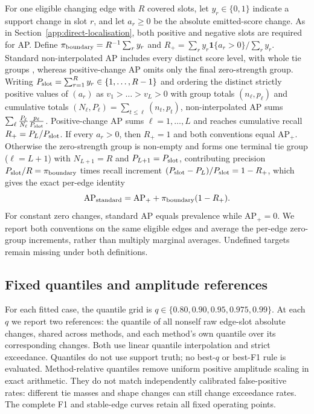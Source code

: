 \documentclass[11pt]{article}
\begin{document}
\label{app:standard-ap}
For one eligible changing edge with $R$ covered slots, let $y_r\in\{0,1\}$ indicate a support change
in slot $r$, and let $a_r\geq0$ be the absolute emitted-score change.
As in Section~\ref{app:direct-localisation}, both positive and negative slots
are required for AP. Define $\pi_{\rm boundary}=R^{-1}\sum_r y_r$ and
$R_+=\sum_r y_r\mathbf1\{a_r>0\}/\sum_r y_r$.
Standard non-interpolated AP includes every distinct score level, with whole
tie groups \citep{sklearn_average_precision_docs}, whereas positive-change AP
omits only the final zero-strength group. Writing $P_{\rm slot}=\sum_{r=1}^R y_r\in\{1,\dots,R-1\}$
and ordering the distinct strictly positive values of $(a_r)$ as
$v_1>\dots>v_L>0$ with group totals $(n_\ell,p_\ell)$ and cumulative totals
$(N_\ell,P_\ell)=\sum_{t\le\ell}(n_t,p_t)$, non-interpolated AP sums
$\sum_{\ell}\frac{P_\ell}{N_\ell}\frac{p_\ell}{P_{\rm slot}}$.
Positive-change AP sums $\ell=1,\dots,L$ and reaches cumulative recall
$R_+=P_L/P_{\rm slot}$. If every $a_r>0$, then $R_+=1$ and both conventions equal
$\mathrm{AP}_+$. Otherwise the zero-strength group is non-empty and forms one
terminal tie group ($\ell=L+1$) with $N_{L+1}=R$ and $P_{L+1}=P_{\rm slot}$,
contributing precision $P_{\rm slot}/R=\pi_{\rm boundary}$ times recall increment
$(P_{\rm slot}-P_L)/P_{\rm slot}=1-R_+$, which gives the exact per-edge identity
\begin{equation}
\mathrm{AP}_{\rm standard}
=\mathrm{AP}_+ + \pi_{\rm boundary}(1-R_+).
\label{eq:ap-zero-group}
\end{equation}
For constant zero changes, standard AP equals prevalence while $\mathrm{AP}_+=0$.
We report both conventions on the same eligible edges and average the
per-edge zero-group increments, rather than multiply marginal averages.
Undefined targets remain missing under both definitions.

\subsection{Fixed quantiles and amplitude references}
\label{app:threshold-sensitivity}
For each fitted case, the quantile grid is
$q\in\{0.80,0.90,0.95,0.975,0.99\}$. At each $q$ we report two references:
the quantile of all nonself raw edge-slot absolute changes, shared across
methods, and each method's own quantile over its corresponding changes.
Both use linear quantile interpolation and strict exceedance. Quantiles do
not use support truth; no best-$q$ or best-F1 rule is evaluated.
Method-relative quantiles remove uniform positive amplitude scaling in exact
arithmetic. They do not match independently calibrated false-positive rates:
different tie masses and shape changes can still change exceedance rates.
The complete F1 and stable-edge curves retain all fixed operating points.
\end{document}
